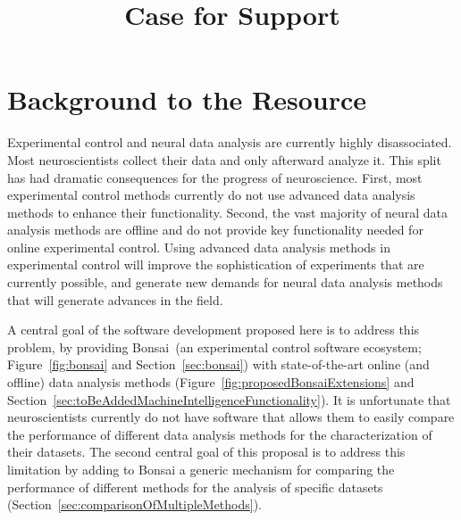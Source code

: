 \documentclass[a4paper,11point]{article}
\title{Case for Support}
\author{}
\begin{document}
\maketitle

\tableofcontents
    
\newpage

\section{Background to the Resource}

Experimental control and neural data analysis are currently highly
disassociated.  Most neuroscientists collect their data and only afterward
analyze it. This split has had dramatic consequences for the progress of
neuroscience. First, most experimental control methods currently do not use
advanced data analysis methods to enhance their functionality. Second, the vast
majority of neural data analysis methods are offline and do not provide key
functionality needed for online experimental control. Using advanced data
analysis methods in experimental control will improve the sophistication of
experiments that are currently possible, and generate new demands for neural
data analysis methods that will generate advances in the field.

A central goal of the software development proposed here is to address this
problem, by providing Bonsai~(an experimental control software ecosystem;
Figure~\ref{fig:bonsai} and Section~\ref{sec:bonsai}) with state-of-the-art online (and offline) data
analysis methods (Figure~\ref{fig:proposedBonsaiExtensions} and 
Section~\ref{sec:toBeAddedMachineIntelligenceFunctionality}).
%
It is unfortunate that neuroscientists currently do not have software that
allows them to easily compare the performance of different data analysis
methods for the characterization of their datasets. The second central goal
of this proposal is to address this limitation by adding to Bonsai a generic
mechanism for comparing the performance of different methods for the analysis
of specific datasets (Section~\ref{sec:comparisonOfMultipleMethods}).
\end{document}
